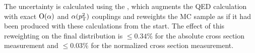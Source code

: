 The uncertainty is calculated using the \FSRWeightProducer, which augments the
\PYTHIA QED calculation with exact $\operatorname{O}\!\left( \alpha \right)$ and $\alpha(p_{\mathrm{T}}^{2})$
couplings and reweights the MC sample as if it had been produced with these
calculations from the start. The effect of this reweighting on the final
\phistar distribution is $\le 0.34\%$ for the absolute cross section
measurement and $\le 0.03\%$ for the normalized cross section measurement.

%
%
%
%
%
%
%

